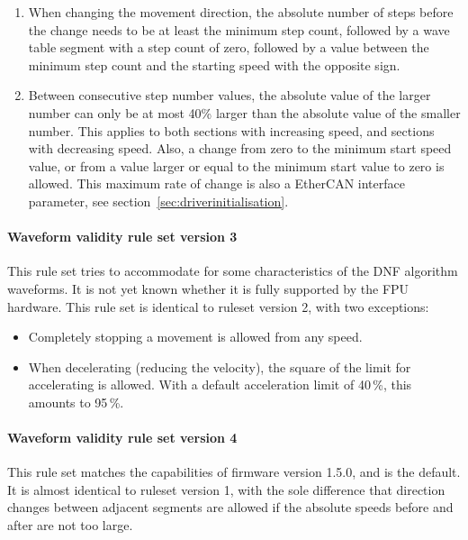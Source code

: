 \documentclass[11pt,a4paper]{scrartcl}
\begin{document}
\begin{enumerate}
\item When changing the movement direction, the absolute number of
  steps before the change needs to be at least the minimum step count,
  followed by a wave table segment with a step count of zero, followed
  by a value between the minimum step count and the starting speed
  with the opposite sign.

\item Between consecutive step number values, the absolute value of
  the larger number can only be at most 40\% larger than the absolute
  value of the smaller number. This applies to both sections with
  increasing speed, and sections with decreasing speed. Also, a change
  from zero to the minimum start speed value, or from a value larger
  or equal to the minimum start value to zero is allowed. This maximum
  rate of change is also a EtherCAN interface parameter, see
  section~\ref{sec:driverinitialisation}.

  
\end{enumerate}

\paragraph{Waveform validity rule set version 3}

This rule set tries to accommodate for some characteristics of the DNF
algorithm waveforms. It is not yet known whether it is fully supported
by the FPU hardware. This rule set is identical to ruleset version 2,
with two exceptions:

\begin{itemize}
\item Completely stopping a movement is allowed from any speed.
\item When decelerating (reducing the velocity), the square of
  the limit for accelerating is allowed. With a default
  acceleration limit of 40\,\%, this amounts to 95\,\%.
\end{itemize}


\paragraph{Waveform validity rule set version 4}
\label{sec:wfrulesetv4}

This rule set matches the capabilities of firmware version 1.5.0, and
is the default. It is almost identical to ruleset version 1, with the
sole difference that direction changes between adjacent segments are
allowed if the absolute speeds before and after are not too large.
\end{document}
